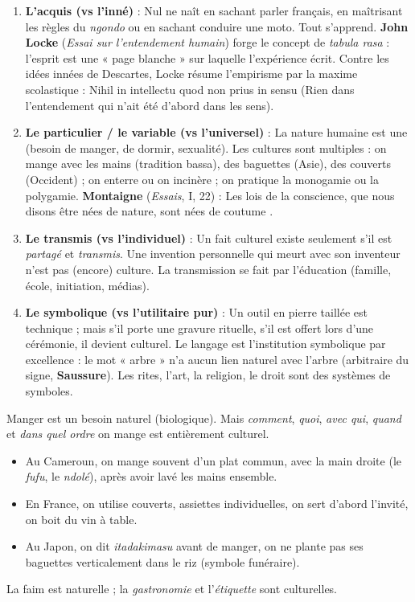 \documentclass[11pt]{article}
\newcommand{\cle}[1]{{\popxbold\color{popdark}#1}}
\begin{document}
\begin{enumerate}
    \item \textbf{L'acquis (vs l'inné)} : Nul ne naît en sachant parler français, en maîtrisant les règles du \emph{ngondo} ou en sachant conduire une moto. Tout s'apprend. \textbf{John Locke} (\emph{Essai sur l'entendement humain}) forge le concept de \emph{tabula rasa} : l'esprit est une « page blanche » sur laquelle l'expérience écrit. Contre les \cle{idées innées} de Descartes, Locke résume l'empirisme par la maxime scolastique : \guillemotleft Nihil in intellectu quod non prius in sensu \guillemotright (Rien dans l'entendement qui n'ait été d'abord dans les sens).
    \item \textbf{Le particulier / le variable (vs l'universel)} : La nature humaine est une (besoin de manger, de dormir, sexualité). Les cultures sont multiples : on mange avec les mains (tradition bassa), des baguettes (Asie), des couverts (Occident) ; on enterre ou on incinère ; on pratique la monogamie ou la polygamie. \textbf{Montaigne} (\emph{Essais}, I, 22) : \guillemotleft Les lois de la conscience, que nous disons être nées de nature, sont nées de coutume \guillemotright.
    \item \textbf{Le transmis (vs l'individuel)} : Un fait culturel existe seulement s'il est \emph{partagé} et \emph{transmis}. Une invention personnelle qui meurt avec son inventeur n'est pas (encore) culture. La transmission se fait par l'\cle{éducation} (famille, école, initiation, médias).
    \item \textbf{Le symbolique (vs l'utilitaire pur)} : Un outil en pierre taillée est technique ; mais s'il porte une gravure rituelle, s'il est offert lors d'une cérémonie, il devient culturel. Le langage est l'institution symbolique par excellence : le mot « arbre » n'a aucun lien naturel avec l'arbre (arbitraire du signe, \textbf{Saussure}). Les rites, l'art, la religion, le droit sont des systèmes de symboles.
\end{enumerate}

\begin{exemplebox}
Manger est un besoin \cle{naturel} (biologique). Mais \emph{comment}, \emph{quoi}, \emph{avec qui}, \emph{quand} et \emph{dans quel ordre} on mange est entièrement \cle{culturel}.
\begin{itemize}
    \item Au Cameroun, on mange souvent d'un plat commun, avec la main droite (le \emph{fufu}, le \emph{ndolé}), après avoir lavé les mains ensemble.
    \item En France, on utilise couverts, assiettes individuelles, on sert d'abord l'invité, on boit du vin à table.
    \item Au Japon, on dit \emph{itadakimasu} avant de manger, on ne plante pas ses baguettes verticalement dans le riz (symbole funéraire).
\end{itemize}
La faim est naturelle ; la \emph{gastronomie} et l'\emph{étiquette} sont culturelles.
\end{exemplebox}
\end{document}

